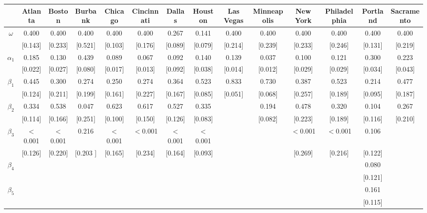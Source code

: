 \documentclass{article}
\begin{document}
\begin{sidewaystable}[htbp]
\begin{tabular}{cccccccccccccc}
			& Atlanta & Boston & Burbank & Chicago & Cincinnati & Dallas & Houston & Las Vegas & Minneapolis & New York & Philadelphia & Portland & Sacramento \\
			\midrule
			$\omega$ & 0.400 & 0.400 & 0.400 & 0.400 & 0.400 & 0.267 & 0.141 & 0.400 & 0.400 & 0.400 & 0.400 & 0.400 & 0.400 \\
			& [0.143] & [0.233] & [0.521] & [0.103] & [0.176] & [0.089] & [0.079] & [0.214] & [0.239] & [0.233] & [0.246] & [0.131] & [0.219] \\
			$\alpha_{1}$  & 0.185 &	0.130 &	0.439 &	0.089 	&0.067 	&0.092 	&0.140 &	0.139 &	0.037 	&0.100 	&0.121 	&0.300 &	0.223 \\
			& [0.022] & [0.027] & [0.080] & [0.017] & [0.013] & [0.092] & [0.038] & [0.014] & [0.012] & [0.029] & [0.029] & [0.034] & [0.043] \\
			$\beta_{1}$  & 0.445 &	0.300 	&0.274 &	0.250 &	0.274 &	0.364 &	0.523 &	0.833 &	0.730 &	0.387 &	0.523 &	0.214 &	0.477  \\
			&[0.124] 	&[0.211] &[0.199]& 	[0.161]	&[0.227]&[0.167]&[0.085]&[0.051]&[0.068]&[0.257]&[0.189]&[0.095]&[0.187] \\
			$\beta_{2}$ &0.334 &	0.538 &	0.047 &	0.623 &	0.617 &	0.527 &	0.335 &&0.194 &	0.478 &0.320 & 0.104 &0.267  \\
			& [0.114] &	[0.166] &	[0.251] &	[0.100] &	[0.150] &	[0.126] &	[0.083] &&	[0.082] &	[0.223] &	[0.189] &	[0.116] 	&[0.210]  \\
			$\beta_{3}$ & $<$0.001 	&$<$0.001 	&0.216 &	$<$0.001 &	$<$0.001 &	$<$0.001 &	$<$0.001 &	&&	$<$0.001 &	$<$0.001 &	0.106 &	 \\
			& [0.126] &	[0.220] &	[0.203 ]&	[0.165]&	[0.234]&	[0.164]&	[0.093]&	&&[0.269] &	[0.216]& 	[0.122] &	   \\
			$\beta_{4}$ & &   &   &   &   &  & &   &   &   &   & 0.080 &   \\
			&  &   &   &   &   &  &  &   &   &   &   & [0.121] &   \\
			$\beta_{5}$ &  &   &   &   &   &  &  &   &   &   &   & 0.161&   \\
			& &   &   &   &   & &  &   &   &   &   & [0.115] &   \\
			\bottomrule
		\end{tabular}
	\end{sidewaystable}
	
	
	
	
	
\end{document}
